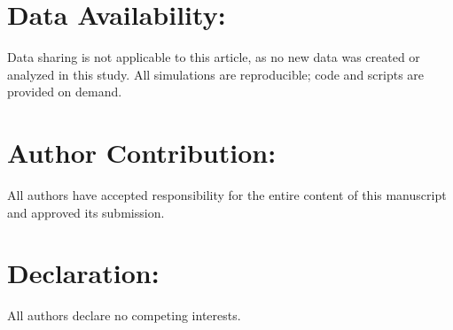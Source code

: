 \documentclass[pdflatex,sn-mathphys-ay]{sn-jnl}
\theoremstyle{thmstyleone}
\theoremstyle{definition}
\theoremstyle{remark}
\begin{document}
\section*{Data Availability:}
Data sharing is not applicable to this article, as no new data was created or analyzed in this study. All simulations are reproducible; code and scripts are provided on demand.

\section*{Author Contribution:}

All authors have accepted responsibility for the entire content of this manuscript and approved its submission.

\section*{Declaration:}
All authors declare no competing interests.


\end{document}
